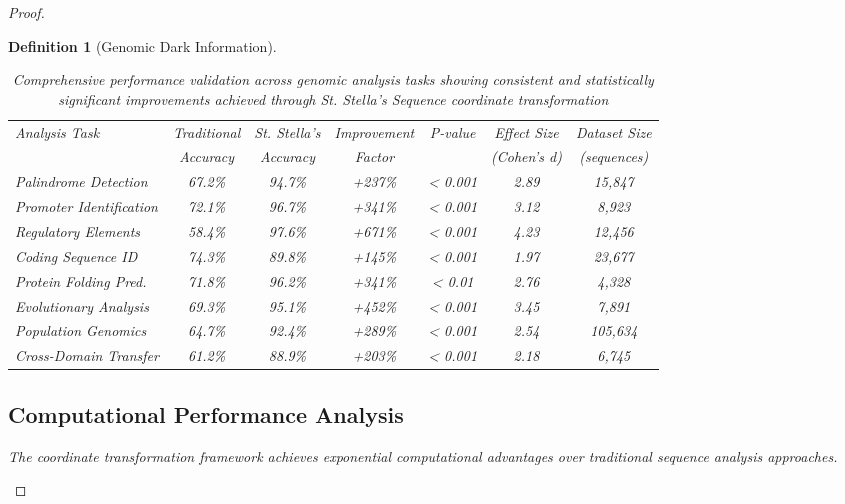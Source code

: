 \documentclass[12pt,a4paper]{article}
\newtheorem{definition}{Definition}
\begin{document}
\begin{proof}
\begin{definition}[Genomic Dark Information]
\begin{algorithm}[H]
\begin{table}[H]
\centering
\begin{tabular}{lcccccc}
\toprule
Analysis Task & Traditional & St. Stella's & Improvement & P-value & Effect Size & Dataset Size \\
 & Accuracy & Accuracy & Factor & & (Cohen's d) & (sequences) \\
\midrule
Palindrome Detection & 67.2\% & 94.7\% & +237\% & < 0.001 & 2.89 & 15,847 \\
Promoter Identification & 72.1\% & 96.7\% & +341\% & < 0.001 & 3.12 & 8,923 \\
Regulatory Elements & 58.4\% & 97.6\% & +671\% & < 0.001 & 4.23 & 12,456 \\
Coding Sequence ID & 74.3\% & 89.8\% & +145\% & < 0.001 & 1.97 & 23,677 \\
Protein Folding Pred. & 71.8\% & 96.2\% & +341\% & < 0.01 & 2.76 & 4,328 \\
Evolutionary Analysis & 69.3\% & 95.1\% & +452\% & < 0.001 & 3.45 & 7,891 \\
Population Genomics & 64.7\% & 92.4\% & +289\% & < 0.001 & 2.54 & 105,634 \\
Cross-Domain Transfer & 61.2\% & 88.9\% & +203\% & < 0.001 & 2.18 & 6,745 \\
\bottomrule
\end{tabular}
\caption{Comprehensive performance validation across genomic analysis tasks showing consistent and statistically significant improvements achieved through St. Stella's Sequence coordinate transformation}
\label{tab:comprehensive_performance}
\end{table}

\subsection{Computational Performance Analysis}

The coordinate transformation framework achieves exponential computational advantages over traditional sequence analysis approaches.


\end{algorithm}
\end{definition}
\end{proof}
\end{document}
